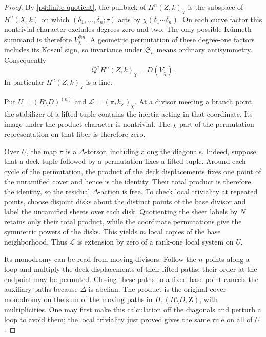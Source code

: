 \documentclass[11pt]{article}
\theoremstyle{plain}
\theoremstyle{definition}
\theoremstyle{remark}
\numberwithin{equation}{section}
\begin{document}
\begin{proof}
By \eqref{p4:finite-quotient}, the pullback of
$H^n(Z,k)_\chi$ is the subspace of $H^n(X,k)$ on which
$(\delta_1,\ldots,\delta_n;\tau)$ acts by
$\chi(\delta_1\cdots\delta_n)$.  On each curve factor this
nontrivial character excludes degrees zero and two.  The only
possible K\"unneth summand is therefore $V_\chi^{\otimes n}$.
A geometric permutation of these degree-one factors includes
its Koszul sign, so invariance under $\mathfrak S_n$ means
ordinary antisymmetry.  Consequently
\begin{equation}
 \label{p4:eq:cyclic-determinant-line}
 Q^*H^n(Z,k)_\chi=D(V_\chi).
\end{equation}
In particular $H^n(Z,k)_\chi$ is a line.

Put $U=(B\setminus D)^{(n)}$ and
$\mathcal L=(\pi_*k_Z)_\chi$.  At a divisor meeting a branch
point, the stabilizer of a lifted tuple contains the inertia
acting in that coordinate.  Its image under the product
character is nontrivial.  The $\chi$-part of the permutation
representation on that fiber is therefore zero.

Over $U$, the map $\pi$ is a $\Delta$-torsor, including along
the diagonals.  Indeed, suppose that a deck tuple followed by a
permutation fixes a lifted tuple.  Around each cycle of the
permutation, the product of the deck displacements fixes one
point of the unramified cover and hence is the identity.  Their
total product is therefore the identity, so the residual
$\Delta$-action is free.  To check local triviality at repeated
points, choose disjoint disks about the distinct points of the
base divisor and label the unramified sheets over each disk.
Quotienting the sheet labels by $N$ retains only their total
product, while the coordinate permutations give the symmetric
powers of the disks.  This yields $m$ local copies of the
base neighborhood.  Thus $\mathcal L$ is extension by zero
of a rank-one local system on $U$.

Its monodromy can be read from moving divisors.  Follow the
$n$ points along a loop and multiply the deck displacements
of their lifted paths; their order at the endpoint may be
permuted.  Closing these paths to a fixed base point cancels
the auxiliary paths because $\Delta$ is abelian.  The product
is the original cover monodromy on the sum of the moving
paths in $H_1(B\setminus D,\mathbf Z)$, with multiplicities.
One may first make this calculation off the diagonals and
perturb a loop to avoid them; the local triviality just proved
gives the same rule on all of $U$.


\end{proof}
\end{document}
